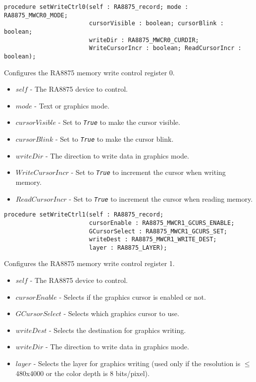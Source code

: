 \documentclass[10pt, openany]{book}
\newcommand{\indexfunc}[1]{\index[func]{#1}}
\newcommand{\constant}[1]{\emph{\texttt{#1}}}
\begin{document}
\begin{lstlisting}
procedure setWriteCtrl0(self : RA8875_record; mode : RA8875_MWCR0_MODE;
                        cursorVisible : boolean; cursorBlink : boolean;
                        writeDir : RA8875_MWCR0_CURDIR;
                        WriteCursorIncr : boolean; ReadCursorIncr : boolean);
\end{lstlisting}
\indexfunc{setWriteCtrl0}
Configures the RA8875 memory write control register 0.
\begin{itemize}
  \item $self$ - The RA8875 device to control.
  \item $mode$ - Text or graphics mode.
  \item $cursorVisible$ - Set to \constant{True} to make the cursor visible.
  \item $cursorBlink$ - Set to \constant{True} to make the cursor blink.
  \item $writeDir$ - The direction to write data in graphics mode.
  \item $WriteCursorIncr$ - Set to \constant{True} to increment the cursor when writing memory.
  \item $ReadCursorIncr$ - Set to \constant{True} to increment the cursor when reading memory.
\end{itemize}

\begin{lstlisting}
procedure setWriteCtrl1(self : RA8875_record;
                        cursorEnable : RA8875_MWCR1_GCURS_ENABLE;
                        GCursorSelect : RA8875_MWCR1_GCURS_SET;
                        writeDest : RA8875_MWCR1_WRITE_DEST;
                        layer : RA8875_LAYER);
\end{lstlisting}
\indexfunc{setWriteCtrl1}
Configures the RA8875 memory write control register 1.
\begin{itemize}
  \item $self$ - The RA8875 device to control.
  \item $cursorEnable$ - Selects if the graphics cursor is enabled or not.
  \item $GCursorSelect$ - Selects which graphics cursor to use.
  \item $writeDest$ - Selects the destination for graphics writing.
  \item $writeDir$ - The direction to write data in graphics mode.
  \item $layer$ - Selects the layer for graphics writing (used only if the resolution is $\le$480x4000 or the color depth is 8 bits/pixel).
\end{itemize}
\end{document}
